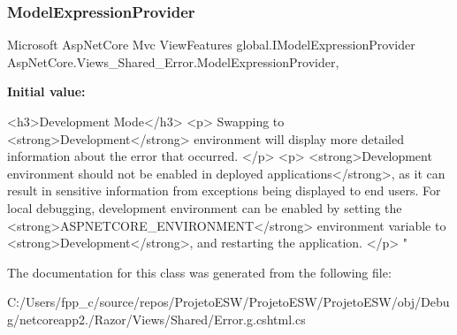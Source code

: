 \subsubsection{\texorpdfstring{Model\+Expression\+Provider}{ModelExpressionProvider}}
{\footnotesize\ttfamily Microsoft Asp\+Net\+Core Mvc View\+Features global.\+I\+Model\+Expression\+Provider Asp\+Net\+Core.\+Views\+\_\+\+Shared\+\_\+\+Error.\+Model\+Expression\+Provider\hspace{0.3cm}{\ttfamily [get]}, {}}

{\bfseries Initial value\+:}
\begin{DoxyCode}

<h3>Development Mode</h3>
<p>
    Swapping to <strong>Development</strong> environment will display more detailed information about the 
      error that occurred.
</p>
<p>
    <strong>Development environment should not be enabled in deployed applications</strong>, as it can 
      result in sensitive information from exceptions being displayed to end users. For local debugging, development 
      environment can be enabled by setting the <strong>ASPNETCORE\_ENVIRONMENT</strong> environment variable to
       <strong>Development</strong>, and restarting the application.
</p>
\textcolor{stringliteral}{"}
\end{DoxyCode}


The documentation for this class was generated from the following file\+:\begin{DoxyCompactItemize}
\item 
C\+:/\+Users/fpp\+\_\+c/source/repos/\+Projeto\+E\+S\+W/\+Projeto\+E\+S\+W/\+Projeto\+E\+S\+W/obj/\+Debug/netcoreapp2./\+Razor/\+Views/\+Shared/Error.\+g.\+cshtml.\+cs\end{DoxyCompactItemize}

